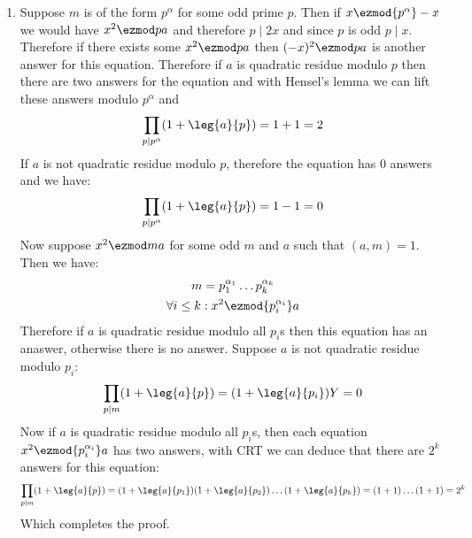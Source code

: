 \begin{enumerate}[label=]
    \item 
        Suppose $m$ is of the form $p^\alpha$ for some odd prime $p$. Then if $x \ezmod{p^\alpha} -x$ we would have $x^2 \ezmod p a$ and therefore $p \mid 2x$ and since $p$ is odd $p \mid x$.
        Therefore if there exists some $x^2 \ezmod p a$ then $(-x)^2 \ezmod p a$ is another answer for this equation. Therefore if $a$ is quadratic residue modulo $p$ then there are two answers for the equation and with Hensel's lemma we can lift these answers modulo $p^\alpha$ and
        \begin{gather*}
            \prod_{p \mid p^\alpha} (1 + \leg{a}{p}) = 1 + 1 = 2
        \end{gather*}
        If $a$ is not quadratic residue modulo $p$, therefore the equation has 0 answers and we have:
        \begin{gather*}
            \prod_{p \mid p^\alpha} (1 + \leg{a}{p}) = 1 - 1 = 0
        \end{gather*}
        Now suppose $x^2 \ezmod m a$ for some odd $m$ and $a$ such that $(a, m) = 1$. Then we have:
        \begin{gather*}
            m = p_1^{\alpha_1} \dots p_k^{\alpha_k} \\
            \forall i \le k: x^2 \ezmod{p_i^{\alpha_i}} a
        \end{gather*}
        Therefore if $a$ is quadratic residue modulo all $p_i$s then this equation has an anaswer, otherwise there is no answer. Suppose $a$ is not quadratic residue modulo $p_i$:
        \begin{gather*}
            \prod_{p \mid m} (1 + \leg{a}{p}) = (1 + \leg{a}{p_i}) Y = 0
        \end{gather*}
        Now if $a$ is quadratic residue modulo all $p_i$s, then each equation $x^2 \ezmod{p_i^{\alpha_i}} a$ has two answers, with CRT we can deduce that there are $2^k$ answers for this equation:
        \begin{gather*}
            \prod_{p \mid m} (1 + \leg{a}{p}) = (1 + \leg{a}{p_1}) (1 + \leg{a}{p_2}) \dots (1 + \leg{a}{p_k}) = (1 + 1) \dots (1 + 1) = 2^k
        \end{gather*}
        Which completes the proof.
\end{enumerate}